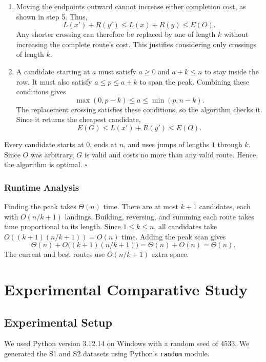 \documentclass{article}
\begin{document}
\begin{enumerate}
    \item Moving the endpoints outward cannot increase either completion cost, as shown in step 5. Thus,
    \[
    L(x')+R(y')\le L(x)+R(y)\le E(O).
    \]
    Any shorter crossing can therefore be replaced by one of length $k$ without increasing the complete route's cost. This justifies considering only crossings of length $k$.

    \item A candidate starting at $a$ must satisfy $a\ge0$ and $a+k\le n$ to stay inside the row. It must also satisfy $a\le p\le a+k$ to span the peak. Combining these conditions gives
    \[
    \max(0,p-k)\le a\le\min(p,n-k).
    \]
    The replacement crossing satisfies these conditions, so the algorithm checks it. Since it returns the cheapest candidate,
    \[
    E(G)\le L(x')+R(y')\le E(O).
    \]
\end{enumerate}

Every candidate starts at $0$, ends at $n$, and uses jumps of lengths $1$ through $k$. Since $O$ was arbitrary, $G$ is valid and costs no more than any valid route. Hence, the algorithm is optimal. \hfill$\square$

\subsubsection{Runtime Analysis}

Finding the peak takes $\Theta(n)$ time. There are at most $k+1$ candidates, each with $O(n/k+1)$ landings. Building, reversing, and summing each route takes time proportional to its length. Since $1\le k\le n$, all candidates take $O((k+1)(n/k+1))=O(n)$ time. Adding the peak scan gives
\[
\Theta(n)+O\bigl((k+1)(n/k+1)\bigr)
=\Theta(n)+O(n)
=\Theta(n).
\]
The current and best routes use $O(n/k+1)$ extra space.

\section{Experimental Comparative Study}

\subsection{Experimental Setup}
We used Python version 3.12.14 on Windows with a random seed of $4533$. We generated the S1 and S2 datasets using Python's \texttt{random} module.
\end{document}
